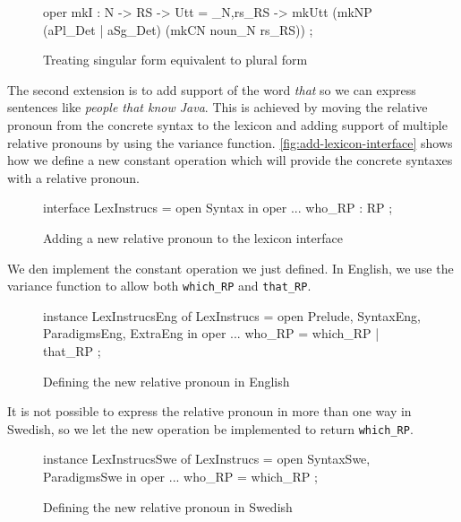 \begin{figure}[H]
\begin{code}
oper
  mkI : N -> RS -> Utt = \noun_N,rs_RS -> mkUtt (mkNP (aPl_Det | aSg_Det)
                             (mkCN noun_N rs_RS)) ;
\end{code}
\caption{Treating singular form equivalent to plural form\label{fig:mkI-modification}}
\end{figure}
The second extension is to add support of the word \emph{that} so we can express sentences like \emph{people that know Java}. This is achieved by moving the relative pronoun from the concrete syntax to the lexicon and adding support of multiple relative pronouns by using the variance function. \autoref{fig:add-lexicon-interface} shows how we define a new constant operation which will provide the concrete syntaxes with a relative pronoun.

\begin{figure}[H]
\begin{code}
interface LexInstrucs = open Syntax in {
  oper
    ...
    who_RP : RP ;
}
\end{code}
\caption{Adding a new relative pronoun to the lexicon interface\label{fig:add-lexicon-interface}}
\end{figure}

We den implement the constant operation we just defined. In English, we use the variance function to allow both \texttt{which\_RP} and \texttt{that\_RP}.

\begin{figure}[H]
\begin{code}
instance LexInstrucsEng of LexInstrucs = open Prelude, SyntaxEng, 
                                      ParadigmsEng, ExtraEng in {
  oper
    ...
    who_RP = which_RP | that_RP ;
}
\end{code}
\caption{Defining the new relative pronoun in English\label{fig:add-lexicon-english}}
\end{figure}

It is not possible to express the relative pronoun in more than one way in Swedish, so we let the new operation be implemented to return \texttt{which\_RP}.

\begin{figure}[H]
\begin{code}
instance LexInstrucsSwe of LexInstrucs = open SyntaxSwe, ParadigmsSwe in {
  oper
    ...
    who_RP = which_RP ;
}
\end{code}
\caption{Defining the new relative pronoun in Swedish\label{fig:add-lexicon-swedish}}
\end{figure}

